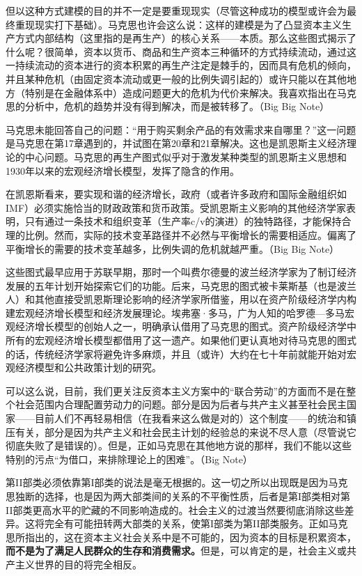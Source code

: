 但以这种方式建模的目的并不一定是要重现现实（尽管这种成功的模型或许会为最终重现现实打下基础）。马克思也许会这么说：这样的建模是为了凸显资本主义生产方式内部结构（这里指的是再生产）的核心关系——本质。那么这些图式揭示了什么呢？很简单，资本以货币、商品和生产资本三种循环的方式持续流动，通过这一持续流动的资本进行的资本积累的再生产注定是棘手的，因而具有危机的倾向，并且某种危机（由固定资本流动或更一般的比例失调引起的）或许只能以在其他地方（特别是在金融体系中）造成问题更大的危机为代价来解决。我喜欢指出在马克思的分析中，危机的趋势并没有得到解决，而是被转移了。（Big Big Note）

马克思未能回答自己的问题：“用于购买剩余产品的有效需求来自哪里？”这一问题是马克思在第17章遇到的，并试图在第20章和21章解决。这也是凯恩斯主义经济理论的中心问题。马克思的再生产图式似乎对于激发某种类型的凯恩斯主义思想和1930年以来的宏观经济增长模型，发挥了隐含的作用。

在凯恩斯看来，要实现和谐的经济增长，政府（或者许多政府和国际金融组织如IMF）必须实施恰当的财政政策和货币政策。受凯恩斯主义影响的其他经济学家表明，只有通过一条技术和组织变革（生产率c/v的演进）的独特路径，才能保持合理的比例。然而，实际的技术变革路径并不必然与平衡增长的需要相适应。偏离了平衡增长的需要的技术变革越多，比例失调的危机就越严重。（Big Big Note）

这些图式最早应用于苏联早期，那时一个叫费尔德曼的波兰经济学家为了制订经济发展的五年计划开始探索它们的功能。后来，马克思的图式被卡莱斯基（也是波兰人）和其他直接受凯恩斯理论影响的经济学家所借鉴，用以在资产阶级经济学内构建宏观经济增长模型和经济发展理论。埃弗塞·多马，广为人知的哈罗德—多马宏观经济增长模型的创始人之一，明确承认借用了马克思的图式。资产阶级经济学中所有的宏观经济增长模型都借用了这一遗产。如果他们更认真地对待马克思的图式的话，传统经济学家将避免许多麻烦，并且（或许）大约在七十年前就能开始对宏观经济模型和公共政策计划的研究。

可以这么说，目前，我们更关注反资本主义方案中的“联合劳动”的方面而不是在整个社会范围内合理配置劳动力的问题。部分是因为后者与共产主义甚至社会民主国家——目前人们不再轻易相信（在我看来这么做是对的）这个制度——的统治和镇压有关，部分是因为共产主义和社会民主计划的经验总的来说不尽人意（尽管说它彻底失败了是错误的）。但是，正如马克思在其他地方说的那样，我们不能以这些特别的污点“为借口，来排除理论上的困难”。（Big Note）


第II部类必须依靠第I部类的说法是毫无根据的。这一切之所以出现既是因为马克思独断的选择，也是因为两大部类间的关系的不平衡性质，后者是第I部类相对第II部类更高水平的贮藏的不同影响造成的。社会主义的过渡当然要彻底消除这些差异。这将完全有可能扭转两大部类的关系，使第I部类为第II部类服务。正如马克思所指出的，这在资本主义社会关系中是不可能的，因为资本的目标是积累资本，\textbf{而不是为了满足人民群众的生存和消费需求。}但是，可以肯定的是，社会主义或共产主义世界的目的将完全相反。

